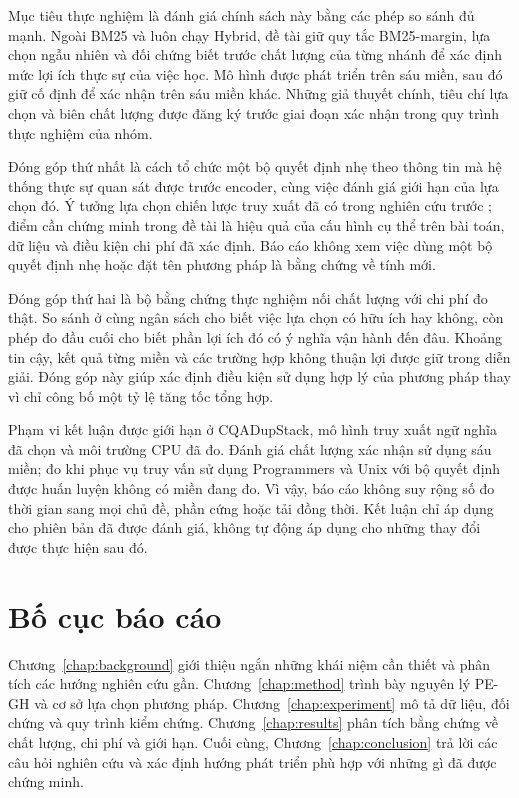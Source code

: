 Mục tiêu thực nghiệm là đánh giá chính sách này bằng các phép so sánh đủ mạnh. Ngoài BM25 và luôn chạy Hybrid, đề tài giữ quy tắc BM25-margin, lựa chọn ngẫu nhiên và đối chứng biết trước chất lượng của từng nhánh để xác định mức lợi ích thực sự của việc học. Mô hình được phát triển trên sáu miền, sau đó giữ cố định để xác nhận trên sáu miền khác. Những giả thuyết chính, tiêu chí lựa chọn và biên chất lượng được đăng ký trước giai đoạn xác nhận trong quy trình thực nghiệm của nhóm.

Đóng góp thứ nhất là cách tổ chức một bộ quyết định nhẹ theo thông tin mà hệ thống thực sự quan sát được trước encoder, cùng việc đánh giá giới hạn của lựa chọn đó. Ý tưởng lựa chọn chiến lược truy xuất đã có trong nghiên cứu trước \cite{arabzadeh2021}; điểm cần chứng minh trong đề tài là hiệu quả của cấu hình cụ thể trên bài toán, dữ liệu và điều kiện chi phí đã xác định. Báo cáo không xem việc dùng một bộ quyết định nhẹ hoặc đặt tên phương pháp là bằng chứng về tính mới.

Đóng góp thứ hai là bộ bằng chứng thực nghiệm nối chất lượng với chi phí đo thật. So sánh ở cùng ngân sách cho biết việc lựa chọn có hữu ích hay không, còn phép đo đầu cuối cho biết phần lợi ích đó có ý nghĩa vận hành đến đâu. Khoảng tin cậy, kết quả từng miền và các trường hợp không thuận lợi được giữ trong diễn giải. Đóng góp này giúp xác định điều kiện sử dụng hợp lý của phương pháp thay vì chỉ công bố một tỷ lệ tăng tốc tổng hợp.

Phạm vi kết luận được giới hạn ở CQADupStack, mô hình truy xuất ngữ nghĩa đã chọn và môi trường CPU đã đo. Đánh giá chất lượng xác nhận sử dụng sáu miền; đo khi phục vụ truy vấn sử dụng Programmers và Unix với bộ quyết định được huấn luyện không có miền đang đo. Vì vậy, báo cáo không suy rộng số đo thời gian sang mọi chủ đề, phần cứng hoặc tải đồng thời. Kết luận chỉ áp dụng cho phiên bản đã được đánh giá, không tự động áp dụng cho những thay đổi được thực hiện sau đó.

\section{Bố cục báo cáo}
Chương~\ref{chap:background} giới thiệu ngắn những khái niệm cần thiết và phân tích các hướng nghiên cứu gần. Chương~\ref{chap:method} trình bày nguyên lý PE-GH và cơ sở lựa chọn phương pháp. Chương~\ref{chap:experiment} mô tả dữ liệu, đối chứng và quy trình kiểm chứng. Chương~\ref{chap:results} phân tích bằng chứng về chất lượng, chi phí và giới hạn. Cuối cùng, Chương~\ref{chap:conclusion} trả lời các câu hỏi nghiên cứu và xác định hướng phát triển phù hợp với những gì đã được chứng minh.

